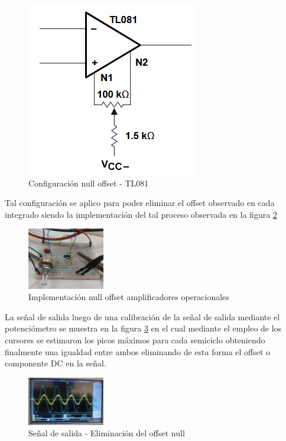 \documentclass[conference]{IEEEtran}
\begin{document}
\begin{figure}[h]
\begin{minipage}{0.4\linewidth}
			\includegraphics[width=\linewidth]{media/offset-null-081}
			\caption{Configuración null offset - TL081}
			\label{fig:offset-null-081}
		\end{minipage}
	\end{figure}
	
	Tal configuración se aplico para poder eliminar el offset observado en cada integrado siendo la implementación del tal proceso observada en la figura \ref{fig:implementacion-null-offset} 
	
	\begin{figure}[h]
		\centering
		\includegraphics[width=0.3\textwidth]{media/implementacion-null-offset}
		\caption{Implementación null offset amplificadores operacionales}
		\label{fig:implementacion-null-offset}
	\end{figure}
	
	La señal de salida luego de una calibración de la señal de salida mediante el potenciómetro se muestra en la figura \ref{fig:salida-offset-null} en el cual mediante el empleo de los cursores se estimaron los picos máximos para cada semiciclo obteniendo finalmente una igualdad entre ambos eliminando de esta forma el offset o componente DC en la señal.
	
	\begin{figure}[h]
		\centering
		\includegraphics[width=0.3\textwidth]{media/salida-offset-null}
		\caption{Señal de salida - Eliminación del offset null}
		\label{fig:salida-offset-null}
	\end{figure}
	
	
	
	
\end{document}
